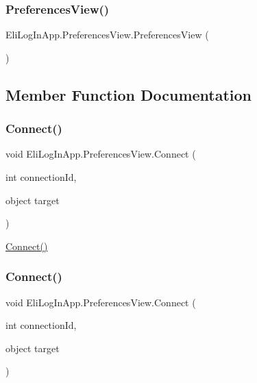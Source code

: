 \subsubsection{\texorpdfstring{Preferences\+View()}{PreferencesView()}}
{\footnotesize\ttfamily Eli\+Log\+In\+App.\+Preferences\+View.\+Preferences\+View (\begin{DoxyParamCaption}{ }\end{DoxyParamCaption})\hspace{0.3cm}{\ttfamily [inline]}}



\subsection{Member Function Documentation}
\mbox{\label{class_eli_log_in_app_1_1_preferences_view_a979b48f7f808413a31c72a11ae2918c8}} 
\subsubsection{\texorpdfstring{Connect()}{Connect()}\hspace{0.1cm}{\footnotesize\ttfamily [1/3]}}
{\footnotesize\ttfamily void Eli\+Log\+In\+App.\+Preferences\+View.\+Connect (\begin{DoxyParamCaption}\item[{int}]{connection\+Id,  }\item[{object}]{target }\end{DoxyParamCaption})\hspace{0.3cm}{\ttfamily [inline]}}



\hyperlink{class_eli_log_in_app_1_1_preferences_view_a979b48f7f808413a31c72a11ae2918c8}{Connect()} 

\mbox{\label{class_eli_log_in_app_1_1_preferences_view_a979b48f7f808413a31c72a11ae2918c8}} 
\subsubsection{\texorpdfstring{Connect()}{Connect()}\hspace{0.1cm}{\footnotesize\ttfamily [2/3]}}
{\footnotesize\ttfamily void Eli\+Log\+In\+App.\+Preferences\+View.\+Connect (\begin{DoxyParamCaption}\item[{int}]{connection\+Id,  }\item[{object}]{target }\end{DoxyParamCaption})\hspace{0.3cm}{\ttfamily [inline]}}



